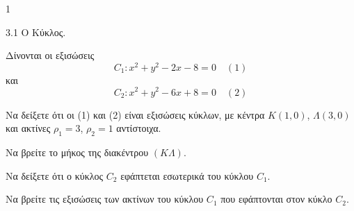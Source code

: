 \begin{ylh}{1}
    \item 3.1 Ο Κύκλος.
\end{ylh}
Δίνονται οι εξισώσεις
\[
    C_1 : x^2 + y^2 - 2x - 8 = 0 \quad (1)
\]
και
\[
    C_2 : x^2 + y^2 - 6x + 8 = 0 \quad (2)
\]
\begin{alist}
\item Να δείξετε ότι οι (1) και (2) είναι εξισώσεις κύκλων, με κέντρα $K(1,0)$, $\Lambda(3,0)$ και ακτίνες $\rho_1=3$, $\rho_2=1$ αντίστοιχα. 
\item
    \begin{rlist}
    \item Να βρείτε το μήκος της διακέντρου $(K\Lambda)$. 
    \item Να δείξετε ότι ο κύκλος $C_2$ εφάπτεται εσωτερικά του κύκλου $C_1$. 
    \end{rlist}
\item Να βρείτε τις εξισώσεις των ακτίνων του κύκλου $C_1$ που εφάπτονται στον κύκλο $C_2$. 
\end{alist}